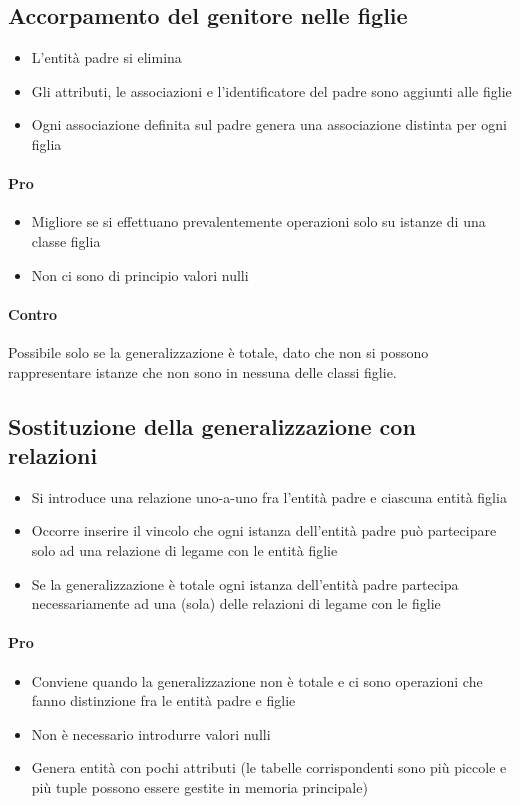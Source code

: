 \subsection{Accorpamento del genitore nelle figlie}
\begin{itemize}
    \item L'entità padre si elimina 
    \item Gli attributi, le associazioni e l'identificatore del padre sono aggiunti alle figlie
    \item Ogni associazione definita sul padre genera una associazione distinta per ogni figlia
\end{itemize}
\paragraph*{Pro}
\begin{itemize}
    \item Migliore se si effettuano prevalentemente operazioni solo su istanze di una classe figlia
    \item Non ci sono di principio valori nulli
\end{itemize}
\paragraph*{Contro}
Possibile solo se la generalizzazione è totale, dato che non si possono rappresentare istanze
che non sono in nessuna delle classi figlie.
\subsection{Sostituzione della generalizzazione con relazioni}
\begin{itemize}
    \item Si introduce una relazione uno-a-uno fra l'entità padre e ciascuna entità figlia
    \item Occorre inserire il vincolo che ogni istanza dell'entità padre può partecipare solo ad 
    una relazione di legame con le entità figlie
    \item Se la generalizzazione è totale ogni istanza dell'entità padre partecipa necessariamente ad una
    (sola) delle relazioni di legame con le figlie
\end{itemize}
\paragraph*{Pro}
\begin{itemize}
    \item Conviene quando la generalizzazione non è totale e ci sono operazioni
    che fanno distinzione fra le entità padre e figlie
    \item Non è necessario introdurre valori nulli
    \item Genera entità con pochi attributi (le tabelle corrispondenti sono più piccole
    e più tuple possono essere gestite in memoria principale)
\end{itemize}
